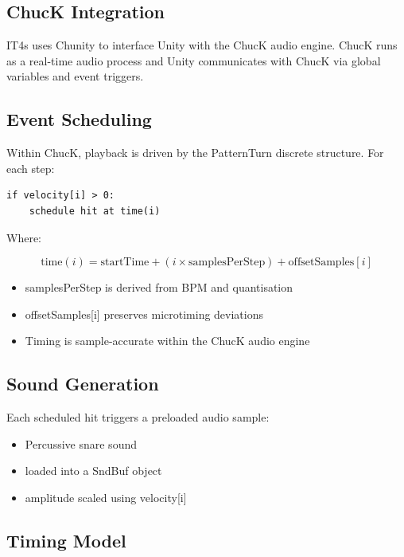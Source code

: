 \subsection{ChucK Integration}\label{chuck-integration}

IT4s uses Chunity to interface Unity with the ChucK audio engine. ChucK
runs as a real-time audio process and Unity communicates with ChucK via
global variables and event triggers.

\subsection{Event Scheduling}\label{event-scheduling}

Within ChucK, playback is driven by the PatternTurn discrete structure.
For each step:

\begin{lstlisting}
if velocity[i] > 0:
    schedule hit at time(i)
\end{lstlisting}

Where:

\[
\mathrm{time}(i) = \mathrm{startTime} + (i \times \mathrm{samplesPerStep}) + \mathrm{offsetSamples}[i]
\]

\begin{itemize}
\item
  samplesPerStep is derived from BPM and quantisation
\item
  offsetSamples{[}i{]} preserves microtiming deviations
\item
  Timing is sample-accurate within the ChucK audio engine
\end{itemize}

\subsection{Sound Generation}\label{sound-generation}

Each scheduled hit triggers a preloaded audio sample:

\begin{itemize}
\item
  Percussive snare sound
\item
  loaded into a SndBuf object
\item
  amplitude scaled using velocity{[}i{]}
\end{itemize}

\subsection{Timing Model}\label{timing-model}

